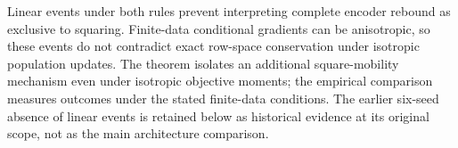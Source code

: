 Linear events under both rules prevent interpreting complete encoder rebound as exclusive to squaring. Finite-data conditional gradients can be anisotropic, so these events do not contradict exact row-space conservation under isotropic population updates. The theorem isolates an additional square-mobility mechanism even under isotropic objective moments; the empirical comparison measures outcomes under the stated finite-data conditions. The earlier six-seed absence of linear events is retained below as historical evidence at its original scope, not as the main architecture comparison.
